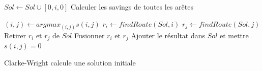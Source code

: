 \documentclass[a4paper,11pt]{article}%
\begin{document}
\begin{algorithm}
\DontPrintSemicolon %

 {
	$Sol \gets Sol \cup [0,i,0]$\;
}
Calculer les savings de toutes les arêtes\;

 {
	$(i,j) \gets argmax_{(i,j)} s(i,j)$\;
	$r_i \gets findRoute(Sol,i)$\;
	$r_j \gets findRoute(Sol,j)$\;
	 {
		Retirer $r_i$ et $r_j$ de $Sol$\;
		Fusionner $r_i$ et $r_j$\;
		Ajouter le résultat dans $Sol$ et mettre $s(i,j) = 0$\;
	}
}

\;
\caption{{\sc Clarke-Wright} calcule une solution initiale}
\label{algo:CW}
\end{algorithm}
\end{document}
